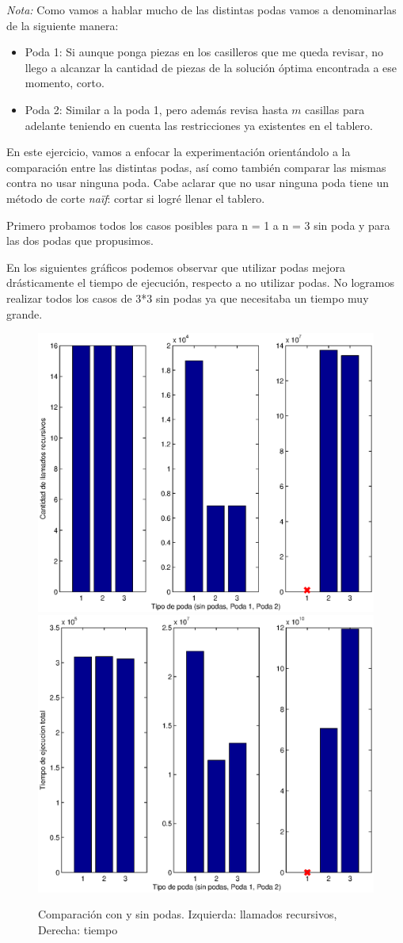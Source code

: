 \emph{Nota:} Como vamos a hablar mucho de las distintas podas vamos a denominarlas de la siguiente manera:
\begin{itemize}
\item Poda 1: Si aunque ponga piezas en los casilleros que me queda revisar, no llego a alcanzar la cantidad de piezas de la solución óptima encontrada a ese momento, corto.
\item Poda 2: Similar a la poda 1, pero además revisa hasta $m$ casillas para adelante teniendo en cuenta las restricciones ya existentes en el tablero.
\end{itemize}

En este ejercicio, vamos a enfocar la experimentación orientándolo a la comparación entre las distintas podas, así como también comparar las mismas contra no usar ninguna poda. Cabe aclarar que no usar ninguna poda tiene un método de corte \emph{naïf}: cortar si logré llenar el tablero.

Primero probamos todos los casos posibles para n = 1 a n = 3 sin poda y para las dos podas que propusimos.

En los siguientes gráficos podemos observar que utilizar podas mejora drásticamente el tiempo de ejecución, respecto a no utilizar podas. No logramos realizar todos los casos de 3*3 sin podas ya que necesitaba un tiempo muy grande.

\begin{center}
  \begin{figure}[H]
    \includegraphics[width=0.5\linewidth]{problema3/graficos/comparacion_podas_todas_instancias_llamados.eps}
    \includegraphics[width=0.5\linewidth]{problema3/graficos/comparacion_podas_todas_instancias_tiempo.eps}
    \caption{Comparación con y sin podas. Izquierda: llamados recursivos, Derecha: tiempo}
    \label{fig:problema3-sin-y-con-podas}
  \end{figure}
\end{center}

